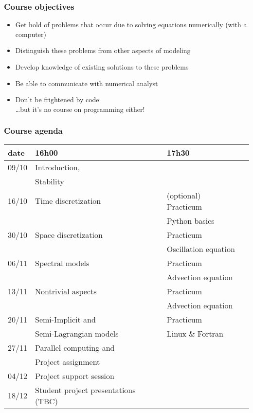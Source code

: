 \documentclass[aspectratio=43,9pt]{beamer}
\begin{document}
%
%
\begin{frame}
	\frametitle{Course objectives}
	\begin{itemize}
		\item Get hold of problems that occur due to solving equations numerically (with a computer)\\[3ex]
\pause
		\item Distinguish these problems from other aspects of modeling
		\item Develop knowledge of existing solutions to these problems
		\item Be able to communicate with numerical analyst\\[3ex]
\pause
		\item Don't be frightened by code\\ \quad\ldots but it's no course on programming either!
	\end{itemize}
\end{frame}
%
%
\begin{frame}
	\frametitle{Course agenda}
	\vspace*{-5mm}
	\begin{center}
		\def\arraystretch{1.3}
		\begin{tabular}{l|lll}
			date	&	16h00	&	17h30 \\
		\hline
			09/10 	& Introduction, \\[-4pt]
					& Stability	\\
			16/10	& Time discretization		&	(optional) Practicum	\\[-4pt]
					&							&	Python basics			\\
			30/10	& Space discretization		&	Practicum				\\[-4pt]
					& 							&	Oscillation equation	\\
			06/11	& Spectral models			& 	Practicum				\\[-4pt]
					&							&	Advection equation 		\\
			13/11	& Nontrivial aspects		&	Practicum				\\[-4pt]
					& 							&	Advection equation		\\
			20/11	& Semi-Implicit and		 	&	Practicum				\\[-4pt]
					& Semi-Lagrangian models	&	Linux \& Fortran		\\
			27/11	& Parallel computing and	&							\\[-4pt]
					& Project assignment		&							\\
		\hline
			04/12	& Project support session	\\
			18/12	& Student project presentations (TBC)
		\end{tabular}
		\def\arraystretch{1}
	\end{center}
\end{frame}
\end{document}
